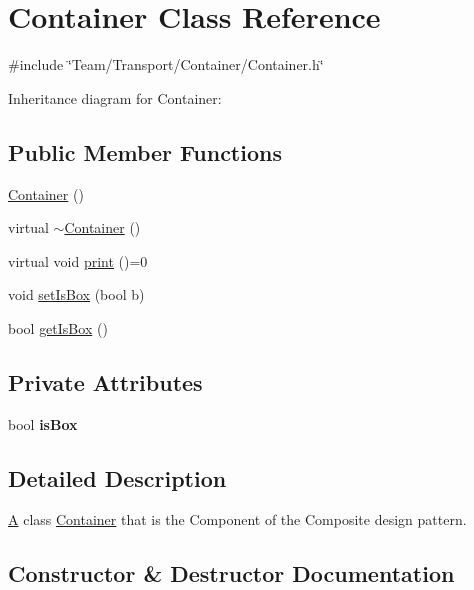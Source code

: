 \hypertarget{classContainer}{}\section{Container Class Reference}
\label{classContainer}


{\ttfamily \#include \char`\"{}Team/\+Transport/\+Container/\+Container.\+h\char`\"{}}



Inheritance diagram for Container\+:
\subsection*{Public Member Functions}
\begin{DoxyCompactItemize}
\item 
\hyperlink{classContainer_a1b0c5515d6863c1bc98cc93b65952f42}{Container} ()
\item 
virtual \hyperlink{classContainer_ae9f5d07bfc3defda274aa06091c19f56}{$\sim$\+Container} ()
\item 
virtual void \hyperlink{classContainer_a0056752dea3f0d49dc085b0284d86ec5}{print} ()=0
\item 
void \hyperlink{classContainer_a9bba4330d6f63a7696f6932819177cac}{set\+Is\+Box} (bool b)
\item 
bool \hyperlink{classContainer_a6b312784119e05843e1b4c4393054d77}{get\+Is\+Box} ()
\end{DoxyCompactItemize}
\subsection*{Private Attributes}
\begin{DoxyCompactItemize}
\item 
\mbox{\label{classContainer_a7ba7e06f1e8e78b34c53f68cd2672a85}} 
bool {\bfseries is\+Box}
\end{DoxyCompactItemize}


\subsection{Detailed Description}
\hyperlink{classA}{A} class \hyperlink{classContainer}{Container} that is the Component of the Composite design pattern. 

\subsection{Constructor \& Destructor Documentation}
\mbox{\label{classContainer_a1b0c5515d6863c1bc98cc93b65952f42}} 
